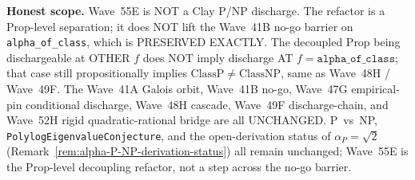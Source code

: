 \begin{remark}
\textbf{Honest scope.} Wave~55E is NOT a Clay P/NP discharge. The refactor is a Prop-level separation; it does NOT lift the Wave~41B no-go barrier on \texttt{alpha\_of\_class}, which is PRESERVED EXACTLY. The decoupled Prop being dischargeable at OTHER $f$ does NOT imply discharge AT $f = \texttt{alpha\_of\_class}$; that case still propositionally implies $\mathrm{ClassP} \neq \mathrm{ClassNP}$, same as Wave~48H / Wave~49F. The Wave~41A Galois orbit, Wave~41B no-go, Wave~47G empirical-pin conditional discharge, Wave~48H cascade, Wave~49F discharge-chain, and Wave~52H rigid quadratic-rational bridge are all UNCHANGED. P~vs~NP, \texttt{PolylogEigenvalueConjecture}, and the open-derivation status of $\alpha_P = \sqrt{2}$ (Remark~\ref{rem:alpha-P-NP-derivation-status}) all remain unchanged; Wave~55E is the Prop-level decoupling refactor, not a step across the no-go barrier.
\end{remark}

